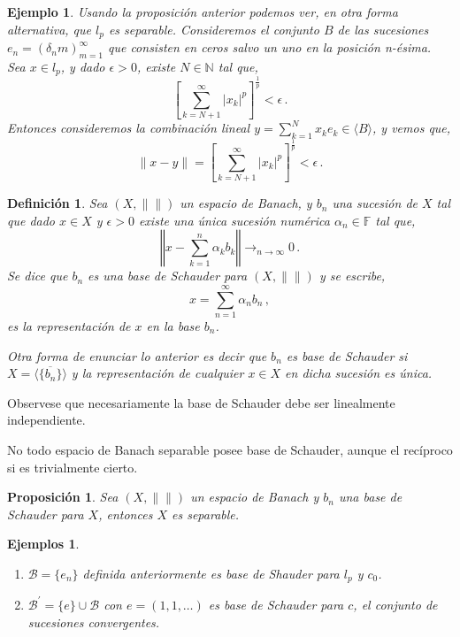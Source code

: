 \documentclass[12pt]{book}
\newtheorem{defn}{\bf Definición}[chapter]
\newtheorem{ejemplo}{\bf Ejemplo}[chapter]
\newtheorem{listaejemplos}{\bf Ejemplos}[chapter]
\newtheorem{prop}{\bf Proposición}[chapter]
\def\beginejems{\begin{listaejemplos}\quad\begin{enumerate}}
\def\endejems{\end{enumerate}\end{listaejemplos}}
\def\NN{\mathbb{N}}
\def\FF{\mathbb{F}}
\newcommand{\abs}[1]{\lvert #1\rvert }
\newcommand{\norm}[1]{\lVert #1\rVert }
\begin{document}
\begin{ejemplo} Usando la proposición anterior podemos ver, en  otra forma alternativa, que  $l_p$ 
es separable. Consideremos el conjunto $B$ de  las sucesiones $e_n=(\delta_nm)_{m=1}^\infty$ 
que consisten en ceros salvo un uno en la posición n-ésima. Sea  $x\in l_p$, y dado $\epsilon>0$, 
existe $N\in \NN$ tal que,
$$\left[\sum_{k=N+1}^\infty \abs{x_k}^p\right]^{\frac{1}{p}}<\epsilon\,.$$
Entonces consideremos la  combinación lineal $y=\sum_{k=1}^N x_k e_k\in \langle B\rangle$, y 
vemos que,
$$\norm{x-y}=\left[\sum_{k=N+1}^\infty \abs{x_k}^p\right]^{\frac{1}{p}}<\epsilon\,.$$

\end{ejemplo}


\begin{defn} Sea $(X,\norm{})$ un espacio de Banach, y $b_n$ una sucesión de $X$ tal que dado  
$x\in X$ y $\epsilon>0$ existe una única sucesión numérica $\alpha_n\in\FF$ tal que,
$$\left\Vert x -\sum_{k=1}^n \alpha_k b_k\right\Vert \mathop{\longrightarrow}_{n\to\infty}0\,.$$
Se dice que $b_n$ es una base de Schauder para $(X,\norm{})$  y se escribe,
$$x=\sum_{n=1}^\infty \alpha_n b_n\,,$$
es la representación de $x$ en la base $b_n$.


Otra forma de enunciar lo anterior es decir que $b_n$ es base de Schauder si $X=\overline{\langle
\{b_n\}\rangle}$  y la representación de cualquier $x\in X$ en dicha sucesión es única. 
\end{defn}

Observese que necesariamente la base de Schauder debe ser linealmente independiente.

 No todo espacio de Banach separable posee base de Schauder, aunque el recíproco si es 
trivialmente  cierto.

\begin{prop}
 Sea $(X,\norm{})$ un espacio de Banach y $b_n$ una base de Schauder para $X$, entonces $X$ 
es separable.
\end{prop}
\beginejems
\item   $\mathcal{B}=\{e_n\}$ definida anteriormente es base de Shauder  para $l_p$ y $c_0$.
\item $\mathcal{B}^\prime =\{e\}\cup\mathcal{B}$  con $e=(1,1,\dots)$  es base de Schauder para 
$c$, el conjunto de sucesiones convergentes. 
\endejems
\end{document}
